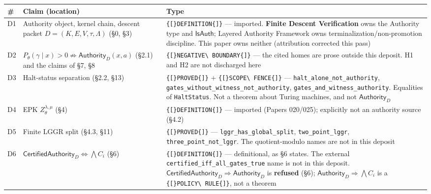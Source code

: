 \documentclass[
  10pt,
]{article}
\DeclareRobustCommand{\texttt}[1]{{\paperSymbolFont\nolinkurl{#1}}}
\begin{document}
\begin{longtable}[]{@{}
  >{\raggedright\arraybackslash}p{}
  >{\raggedright\arraybackslash}p{}
  >{\raggedright\arraybackslash}p{}@{}}
\toprule\noalign{}
\begin{minipage}[b]{\linewidth}\raggedright
\#
\end{minipage} & \begin{minipage}[b]{\linewidth}\raggedright
Claim (location)
\end{minipage} & \begin{minipage}[b]{\linewidth}\raggedright
Type
\end{minipage} \\
\midrule\noalign{}
\endhead
\bottomrule\noalign{}
\endlastfoot
D1 & Authority object, kernel chain, descent packet \protect\hypertarget{math-E0182-0256}{}{\(D = (K,E,V,\tau,\Lambda)\)} (§0, §3) & \texttt{{[}DEFINITION{]}} --- imported. \textbf{Finite Descent Verification} owns the Authority type and \protect\hypertarget{math-E0004-0257}{}{\(\mathsf{IsAuth}\)}; Layered Authority Framework owns terminalization/non-promotion discipline. This paper owns neither (attribution corrected this pass) \\
D2 & \protect\hypertarget{math-E0183-0258}{}{\(P_\theta(\gamma \mid x) > 0 \not\Rightarrow \mathsf{Authority}_D(x,a)\)} (§2.1) and the claims of §7, §8 & \texttt{{[}NEGATIVE\ BOUNDARY{]}} --- the cited homes are prose outside this deposit. H1 and H2 are not discharged here \\
D3 & Halt-status separation (§2.2, §13) & \texttt{{[}PROVED{]}} + \texttt{{[}SCOPE\ FENCE{]}} --- \texttt{halt\_alone\_not\_authority}, \texttt{gates\_without\_witness\_not\_authority}, \texttt{gates\_and\_witness\_authority}. Equalities of \texttt{HaltStatus}. Not a theorem about Turing machines, and not \protect\hypertarget{math-E0010-0259}{}{\(\mathsf{Authority}_D\)} \\
D4 & EPK \protect\hypertarget{math-E0040-0260}{}{\(Z_\theta^{\lambda,\mu}\)} (§4) & \texttt{{[}DEFINITION{]}} --- imported (Papers 020/025); explicitly not an authority source (§4.2) \\
D5 & Finite LGGR split (§4.3, §11) & \texttt{{[}PROVED{]}} --- \texttt{lggr\_has\_global\_split}, \texttt{two\_point\_lggr}, \texttt{three\_point\_not\_lggr}. The quotient-modulo names are not in this deposit \\
D6 & \protect\hypertarget{math-E0184-0261}{}{\(\mathsf{CertifiedAuthority}_D \iff \bigwedge C_i\)} (§6) & \texttt{{[}DEFINITION{]}} --- definitional, as §6 states. The external \texttt{certified\_iff\_all\_gates\_true} name is not in this deposit. \protect\hypertarget{math-E0185-0262}{}{\(\mathsf{CertifiedAuthority}_D \Rightarrow \mathsf{Authority}_D\)} is \textbf{refused} (§6); \protect\hypertarget{math-E0186-0263}{}{\(\mathsf{Authority}_D \Rightarrow \bigwedge C_i\)} is a \texttt{{[}POLICY\ RULE{]}}, not a theorem \\

\end{longtable}
\end{document}
